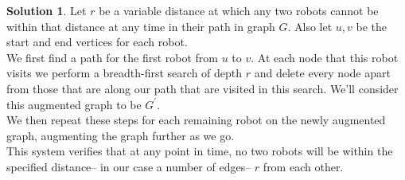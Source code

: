 \documentclass[12pt]{article}
\theoremstyle{definition}
\newtheorem*{solution}{Solution} %
\theoremstyle{plain}
\begin{document}
\begin{enumerate}
\begin{solution}
Let $r$ be a variable distance at which any two robots cannot be within that distance at any time in their path in graph $G$. Also let $u,v$ be the start and end vertices for each robot.\\
We first find a path for the first robot from $u$ to $v$. At each node that this robot visits we perform a breadth-first search of depth $r$ and delete every node apart from those that are along our path that are visited in this search. We'll consider this augmented graph to be $G^\prime$.\\
We then repeat these steps for each remaining robot on the newly augmented graph, augmenting the graph further as we go.\\
This system verifies that at any point in time, no two robots will be within the specified distance-- in our case a number of edges-- $r$ from each other.
\end{solution}
\end{enumerate}
\end{document}
